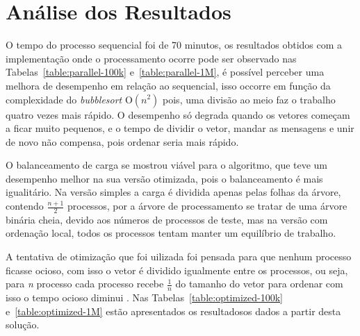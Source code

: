 \section{Análise dos Resultados}

O tempo do processo sequencial foi de 70 minutos, os resultados obtidos com a implementação onde o
processamento ocorre pode ser observado nas Tabelas~\ref{table:parallel-100k}
e~\ref{table:parallel-1M}, é possível perceber uma melhora de desempenho em relação ao sequencial, 
isso occorre em função da complexidade do \emph{bubblesort} O$(n^2)$ pois, uma divisão ao meio 
faz o trabalho quatro vezes mais rápido. O desempenho só degrada quando os vetores começam a ficar
muito pequenos, e o tempo de dividir o vetor, mandar as mensagens e unir de novo não compensa, pois
ordenar seria mais rápido.






O balanceamento de carga se mostrou viável para o algoritmo, que teve um desempenho melhor na sua
versão otimizada, pois o balanceamento é mais igualitário. Na versão simples a carga é dividida
apenas pelas folhas da árvore, contendo $\frac{n+1}{2}$ processos, por a árvore de processamento se
tratar de uma árvore binária cheia, devido aos números de processos de teste, mas na versão com
ordenação local, todos os processos tentam manter um equilíbrio de trabalho.


A tentativa de otimização que foi uilizada foi pensada para que nenhum processo ficasse ocioso, com
isso o vetor é dividido igualmente entre os processos, ou seja, para \emph{n} processo cada processo
recebe $\frac{1}{n}$ do tamanho do vetor para ordenar com isso o tempo ocioso diminui . Nas
Tabelas~\ref{table:optimized-100k} e~\ref{table:optimized-1M} estão apresentados os resultadosos
dados a partir desta solução. 

